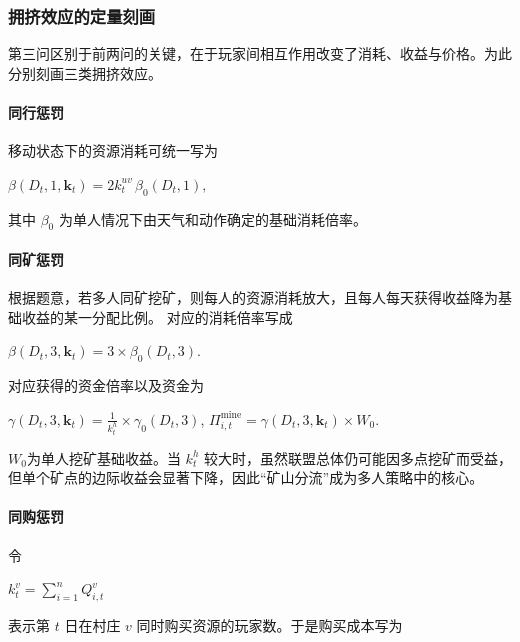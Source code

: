 \subsubsection{拥挤效应的定量刻画}

第三问区别于前两问的关键，在于玩家间相互作用改变了消耗、收益与价格。为此分别刻画三类拥挤效应。

\paragraph{同行惩罚}
移动状态下的资源消耗可统一写为

\begin{center}
    $\beta(D_t,1,\mathbf k_t)=2k_t^{uv}\,\beta_0(D_t,1),$
\end{center}

其中 $\beta_0$ 为单人情况下由天气和动作确定的基础消耗倍率。

\paragraph{同矿惩罚}

根据题意，若多人同矿挖矿，则每人的资源消耗放大，且每人每天获得收益降为基础收益的某一分配比例。
%
对应的消耗倍率写成

\begin{center}
    $\beta(D_t,3,\mathbf k_t)= 3\times\beta_0(D_t,3).$
\end{center}

对应获得的资金倍率以及资金为

\begin{center}
    $\gamma(D_t,3,\mathbf k_t)=  \frac{1}{k_t^h}\times \gamma_0(D_t,3)$,
    $\Pi_{i,t}^{\text{mine}}=\gamma(D_t,3,\mathbf k_t)\times W_0$.
\end{center}

$W_0$为单人挖矿基础收益。当 $k_t^h$ 较大时，虽然联盟总体仍可能因多点挖矿而受益，
%
但单个矿点的边际收益会显著下降，因此“矿山分流”成为多人策略中的核心。

\paragraph{同购惩罚}

令

\begin{center}
    $k_t^v=\sum_{i=1}^n Q_{i,t}^{v}$
\end{center}

表示第 $t$ 日在村庄 $v$ 同时购买资源的玩家数。于是购买成本写为

